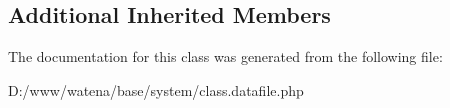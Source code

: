 \subsection*{Additional Inherited Members}


The documentation for this class was generated from the following file\-:\begin{DoxyCompactItemize}
\item 
D\-:/www/watena/base/system/class.\-datafile.\-php\end{DoxyCompactItemize}
